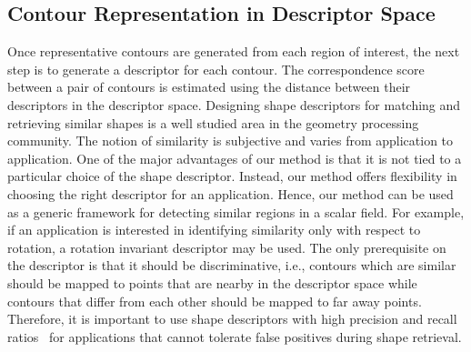 \documentclass[review,journal]{vgtc}         %
\begin{document}
\subsection{Contour Representation in Descriptor Space}
Once representative contours are generated from each region of interest, the next step
is to generate a descriptor for each contour. The correspondence score between a pair of
contours is estimated using the distance between their descriptors in the descriptor space.
Designing shape descriptors for matching and retrieving similar shapes is a well studied 
area in the geometry processing community. 
The notion of similarity is subjective and varies from application to application.
One of the major advantages of our method is that it is not tied to a particular choice
of the shape descriptor. Instead, our method offers flexibility in choosing 
the right descriptor for an application.  Hence, our method can be used as a generic framework for detecting 
similar regions in a scalar field. For example, if an application is interested in 
identifying similarity only with respect to rotation, a rotation invariant descriptor may be used. 
The only prerequisite on the descriptor is that it should be discriminative, i.e., contours which are 
similar should be mapped to points that are nearby in the descriptor space while contours that differ 
from each other should be mapped to far away points. Therefore, it is important to use shape descriptors 
with high precision and recall ratios~\cite{lian2013} for applications that cannot tolerate false 
positives during shape retrieval.
\end{document}
